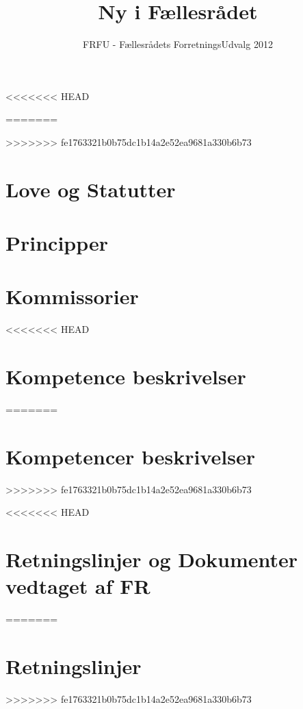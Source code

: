\documentclass[a4paper,danish,12pt,twoside]{report}
\title{Ny i Fællesrådet}
\author{FRFU - Fællesrådets ForretningsUdvalg 2012}
\begin{document}
<<<<<<< HEAD

\maketitle

\newpage
=======

>>>>>>> fe1763321b0b75dc1b14a2e52ea9681a330b6b73
\tableofcontents
\newpage

\newpage

\part{Love og Statutter}
\setcounter{section}{0}



\newpage


\part{Principper}
\setcounter{section}{0}








\newpage

\part{Kommissorier}
\setcounter{section}{0}






<<<<<<< HEAD
\part{Kompetence beskrivelser}
=======
\part{Kompetencer beskrivelser}
>>>>>>> fe1763321b0b75dc1b14a2e52ea9681a330b6b73
\setcounter{section}{0}



<<<<<<< HEAD
\part{Retningslinjer og Dokumenter vedtaget af FR}
=======
\part{Retningslinjer}
>>>>>>> fe1763321b0b75dc1b14a2e52ea9681a330b6b73
\setcounter{section}{0}


%

\end{document}
